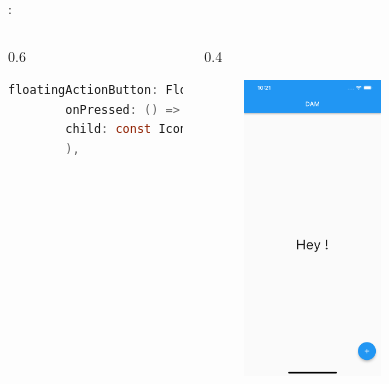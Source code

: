 \documentclass[10pt]{beamer}
\begin{document}
\begin{frame}[fragile,t]{\secname : \subsecname}
\begin{columns}
\begin{column}{0.6\textwidth}
            \begin{lstlisting}[language=C]
    floatingActionButton: FloatingActionButton(
        onPressed: () => {print("Bonjour")},
        child: const Icon(Icons.add),
        ),
    \end{lstlisting}
        \end{column}
        \begin{column}{0.4\textwidth}
            \begin{figure}
                \begin{center}
                    \includegraphics[width=0.60\textwidth]{../assets/img/floatingActionButton.jpg}
                \end{center}
            \end{figure}\end{column}
    \end{columns}
\end{frame}
\end{document}
